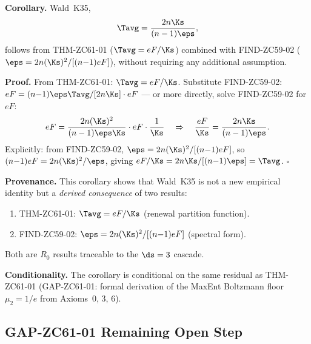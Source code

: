 \documentclass[12pt, a4paper]{article}
\begin{document}
\begin{formalbox}[title={COR-ZC61-01: Wald K35 from T-Canonical
  Axioms ($R_0$, Conditional on GAP-ZC61-01)}]

\textbf{Corollary.}
Wald~K35,
\[
  \Tavg = \frac{2n\Ks}{(n-1)\eps},
\]
follows from THM-ZC61-01 ($\Tavg = eF/\Ks$) combined with
FIND-ZC59-02 ($\eps = 2n(\Ks)^2/[(n{-}1)eF]$), without
requiring any additional assumption.

\textbf{Proof.}
From THM-ZC61-01: $\Tavg = eF/\Ks$.
Substitute FIND-ZC59-02: $eF = (n{-}1)\eps\Tavg/[2n\Ks] \cdot eF$
--- or more directly, solve FIND-ZC59-02 for $eF$:
\[
  eF = \frac{2n(\Ks)^2}{(n-1)\eps\Ks} \cdot eF \cdot \frac{1}{\Ks}
  \quad\Rightarrow\quad
  \frac{eF}{\Ks}
  = \frac{2n\Ks}{(n-1)\eps}.
\]
Explicitly: from FIND-ZC59-02, $\eps = 2n(\Ks)^2/[(n{-}1)eF]$,
so $(n{-}1)eF = 2n(\Ks)^2/\eps$, giving
$eF/\Ks = 2n\Ks/[(n{-}1)\eps] = \Tavg$. $\square$

\textbf{Provenance.}
This corollary shows that Wald~K35 is not a new empirical
identity but a \emph{derived consequence} of two results:
\begin{enumerate}[leftmargin=2em, noitemsep, label=(\roman*)]
  \item THM-ZC61-01: $\Tavg = eF/\Ks$ (renewal partition function).
  \item FIND-ZC59-02: $\eps = 2n(\Ks)^2/[(n{-}1)eF]$ (spectral form).
\end{enumerate}
Both are $R_0$ results traceable to the $\ds = 3$ cascade.

\textbf{Conditionality.}
The corollary is conditional on the same residual as
THM-ZC61-01 (GAP-ZC61-01: formal derivation of the MaxEnt
Boltzmann floor $\mu_2 = 1/e$ from Axioms~0, 3, 6).
\end{formalbox}

\subsection{GAP-ZC61-01 \quad Remaining Open Step}
\label{sec:gap01}

\end{document}
